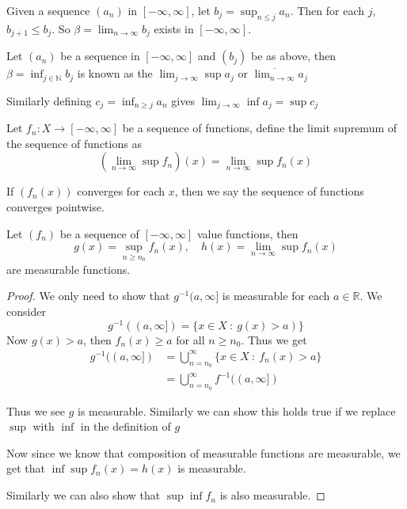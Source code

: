 \begin{remark}
  Given a sequence $(a_n)$ in $[-\infty, \infty]$, let $b_j = \sup_{n \le j} a_n$. Then for each $j$, $b_{j+1} \le b_j$. So $\beta = \lim_{n \to \infty} b_j$ exists in $[-\infty, \infty]$.
\end{remark}

\begin{definition}
  Let $(a_n)$ be a sequence in $[-\infty, \infty]$ and $(b_j)$ be as above, then $\beta = \inf_{j \in \mathbb{N}} b_j$ is known as the $\lim_{j \to \infty} \sup a_j$ or $\overline{\lim_{n \to \infty}} a_j$

  Similarly defining $c_j = \inf_{n \ge j} a_n$ gives $\lim_{j \to \infty} \inf a_j = \sup c_j$
\end{definition}

\begin{definition}
  Let $f_n :X \to [-\infty, \infty]$ be a sequence of functions, define the limit supremum of the sequence of functions as \[
    (\lim_{n \to \infty} \sup f_n)(x) = \lim_{n \to \infty} \sup f_n(x)
  \]
\end{definition}

\begin{remark}
  If $(f_n(x))$ converges for each $x$, then we say the sequence of functions converges pointwise.
\end{remark}

\begin{proposition}
  Let $(f_n)$ be a sequence of $[-\infty, \infty]$ value functions, then \[
    g(x)  = \sup_{n \ge n_0} f_n(x), \quad h(x) = \lim_{n \to \infty} \sup f_n(x)
  \]
  are measurable functions.
\end{proposition}
\begin{proof}
  We only need to show that $g^{-1}(a, \infty]$ is measurable for each $a \in \mathbb{R}$. We consider \[
    g^{-1}((a, \infty]) = \{   x \in X \ : \ g(x) > a) \}
  \]
  Now $g(x) > a$,  then $f_n(x) \ge a$ for all $n \ge n_0$. Thus we get \begin{align*}
    g^{-1}((a, \infty]) &= \bigcup_{n = n_0}^{\infty} \{ x \in X  \ : \  f_n(x) > a \} \\ 
    &= \bigcup_{n = n_0}^{\infty} f^{-1}((a, \infty])
  \end{align*}

   Thus we see $g$ is measurable. Similarly we can show this holds true if we replace $\sup$ with $\inf$ in the definition of $g$

   Now since we know that composition of measurable functions are measurable, we get that $\inf \sup f_n(x) = h(x)$ is measurable.

   Similarly we can also show that $\sup \inf f_n$ is also measurable.
\end{proof}

